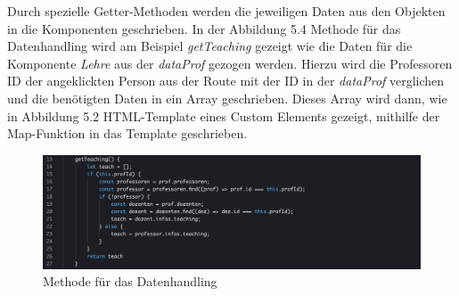 \documentclass[12pt,					%
							 oneside,			%
							 a4paper,			%
							 halfparskip,		%
							 liststotoc,			%
							 bibtotoc,			%
							 fleqn,				%
							 pointlessnumbers]	%
							 {scrreprt}
\begin{document}
	Durch spezielle Getter-Methoden werden die jeweiligen Daten aus den Objekten in die Komponenten geschrieben. In der Abbildung 5.4 Methode für das Datenhandling wird am Beispiel \textit{getTeaching} gezeigt wie die Daten für die Komponente \textit{Lehre} aus der \textit{dataProf} gezogen werden. Hierzu wird die Professoren ID der angeklickten Person aus der Route mit der ID in der \textit{dataProf} verglichen und die benötigten Daten in ein Array geschrieben. Dieses Array wird dann, wie in Abbildung 5.2 HTML-Template eines Custom Elements gezeigt, mithilfe der Map-Funktion in das Template geschrieben.
	\begin{figure}[h]
		\centering
		\includegraphics[width=1\textwidth]{pictures/getTeaching.png}
		\caption{Methode für das Datenhandling}						
		\label{getTeaching}
	\end{figure}
\newpage	
\end{document}
